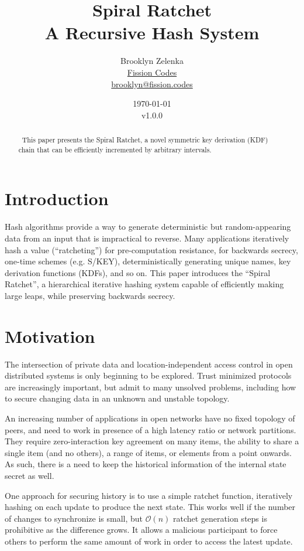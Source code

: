 \documentclass{article}
\title{Spiral Ratchet \\[1ex] \large A Recursive Hash System}
\author{Brooklyn Zelenka \\ \href{https://fission.codes}{Fission Codes} \\ \href{mailto:brooklyn@fission.codes}{brooklyn@fission.codes} }
\date{\today\\v1.0.0}
\begin{document}
    \maketitle
    
   	\begin{abstract}\
   		This paper presents the Spiral Ratchet, a novel symmetric key derivation (KDF) chain that can be efficiently incremented by arbitrary intervals.
   	\end{abstract}

   	\section{Introduction}
   	
	Hash algorithms provide a way to generate deterministic but random-appearing data from an input that is impractical to reverse. Many applications iteratively hash a value (``ratcheting'') for pre-computation resistance, for backwards secrecy, one-time schemes (e.g. S/KEY\cite{rfc1760}), deterministically generating unique names, key derivation functions (KDFs), and so on. This paper introduces the ``Spiral Ratchet'', a hierarchical iterative hashing system capable of efficiently making large leaps, while preserving backwards secrecy.

    \section{Motivation}
    
    The intersection of private data and location-independent access control in open distributed systems is only beginning to be explored. Trust minimized protocols are increasingly important, but admit to many unsolved problems, including how to secure changing data in an unknown and unstable topology.
    
    An increasing number of applications in open networks have no fixed topology of peers, and need to work in presence of a high latency ratio or network partitions. They require zero-interaction key agreement on many items, the ability to share a single item (and no others), a range of items, or elements from a point onwards. As such, there is a need to keep the historical information of the internal state secret as well.
    
    One approach for securing history is to use a simple ratchet function, iteratively hashing on each update to produce the next state. This works well if the number of changes to synchronize is small, but $\mathcal{O}(n)$ ratchet generation steps is prohibitive as the difference grows. It allows a malicious participant to force others to perform the same amount of work in order to access the latest update.
    
\end{document}
